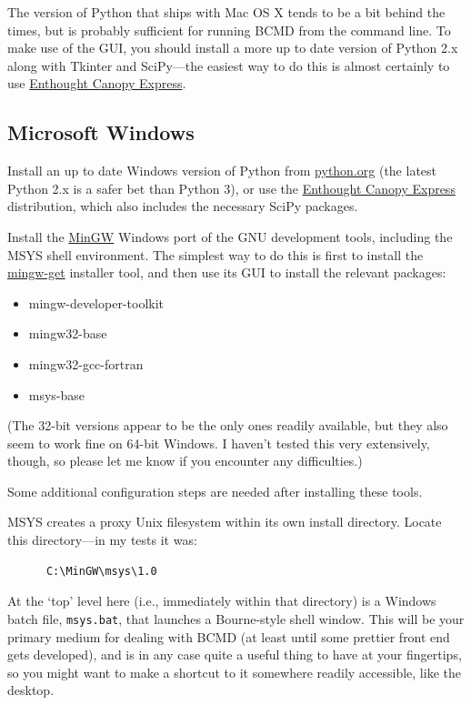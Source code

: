 \documentclass[a4paper,11pt]{article}
\begin{document}
The version of Python that ships with Mac OS X tends to be a bit behind the times, but is probably sufficient for running BCMD from the command line. To make use of the GUI, you should install a more up to date version of Python 2.x along with Tkinter and SciPy---the easiest way to do this is almost certainly to use \href{https://www.enthought.com/downloads/}{Enthought Canopy Express}.

\subsection{Microsoft Windows}\label{win}

Install an up to date Windows version of Python from \href{http://www.python.org/download/releases/}{python.org} (the latest Python 2.x is a safer bet than Python 3), or use the \href{https://www.enthought.com/downloads/}{Enthought Canopy Express} distribution, which also includes the necessary SciPy packages.

Install the \href{http://www.mingw.org}{MinGW} Windows port of the GNU development tools, including the MSYS shell environment. The simplest way to do this is first to install the \href{http://sourceforge.net/projects/mingw/files/Installer/}{mingw-get} installer tool, and then use its GUI to install the relevant packages:

\begin{itemize}
\item mingw-developer-toolkit
\item mingw32-base
\item mingw32-gcc-fortran
\item msys-base
\end{itemize}

(The 32-bit versions appear to be the only ones readily available, but they also seem to work fine on 64-bit Windows. I haven't tested this very extensively, though, so please let me know if you encounter any difficulties.)

Some additional configuration steps are needed after installing these tools.

MSYS creates a proxy Unix filesystem within its own install directory. Locate this directory---in my tests it was:
\begin{verbatim}
      C:\MinGW\msys\1.0
\end{verbatim}
At the `top' level here (i.e., immediately within that directory) is a Windows batch file, \texttt{msys.bat}, that launches a Bourne-style shell window. This will be your primary medium for dealing with BCMD (at least until some prettier front end gets developed), and is in any case quite a useful thing to have at your fingertips, so you might want to make a shortcut to it somewhere readily accessible, like the desktop.
\end{document}
